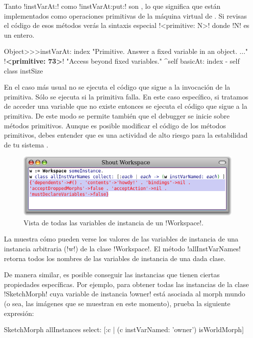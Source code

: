 \documentclass[a4paper,10pt,twoside]{book}
\begin{document}
Tanto \ct!instVarAt:! como \ct!instVarAt:put:! son , lo que significa que están implementados como
operaciones primitivas de la máquina virtual de \pharo.  Si revisas el
código de esos métodos verás la sintaxis especial 
\ct!<primitive: N>! donde \ct!N! es un entero.

\begin{code}{}
Object>>>instVarAt: index
        "Primitive. Answer a fixed variable in an object. ..."
        !\textbf{<primitive: 73>}!
        "Access beyond fixed variables."
        ^self basicAt: index - self class instSize
\end{code}

En el caso más usual no se ejecuta el código que sigue a la invocación
de la primitiva.  Sólo se ejecuta si la primitiva falla.  En este caso
específico, si tratamos de acceder una variable que no existe entonces
se ejecuta el código que sigue a la primitiva.  De este modo se
permite también que el debugger se inicie sobre métodos primitivos.
Aunque es posible modificar el código de los métodos primitivos, debes
entender que es una actividad de alto riesgo para la estabilidad de tu
sistema \pharo.

\begin{figure}[ht]\centering
        \includegraphics[width=\linewidth]{allInstanceVariables}
        \caption{Vista de todas las variables de instancia de un \ct!Workspace!.}
\end{figure}

La  muestra cómo pueden verse los valores
de las variables de instancia de una instancia arbitraria (\ct!w!) de
la clase \ct!Workspace!.  El método \ct!allInstVarNames! retorna todos
los nombres de las variables de instancia de una dada clase.

De manera similar, es posible conseguir las instancias que tienen
ciertas propiedades específicas.  Por ejemplo, para obtener todas las
instancias de la clase \ct!SketchMorph! cuya variable de instancia
\ct!owner! está asociada al morph mundo (o sea, las imágenes que se
muestran en este momento), prueba la siguiente expresión:
\begin{code}{}
SketchMorph allInstances select: [:c | (c instVarNamed: 'owner') isWorldMorph]
\end{code}
\end{document}
